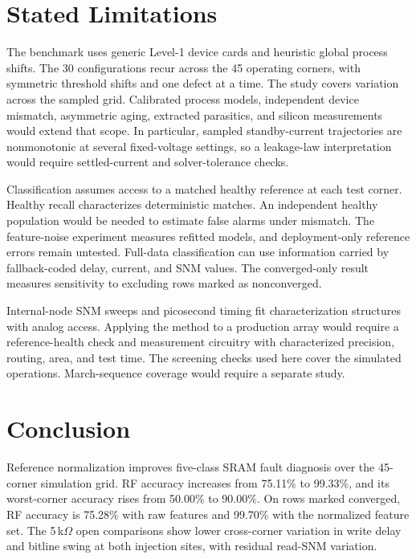 \documentclass[conference]{IEEEtran}
\begin{document}

\section{Stated Limitations}
\label{sec:limits}
The benchmark uses generic Level-1 device cards and heuristic global process shifts. The 30 configurations recur across the 45 operating corners, with symmetric threshold shifts and one defect at a time. The study covers variation across the sampled grid. Calibrated process models, independent device mismatch, asymmetric aging, extracted parasitics, and silicon measurements would extend that scope. In particular, sampled standby-current trajectories are nonmonotonic at several fixed-voltage settings, so a leakage-law interpretation would require settled-current and solver-tolerance checks.

Classification assumes access to a matched healthy reference at each test corner. Healthy recall characterizes deterministic matches. An independent healthy population would be needed to estimate false alarms under mismatch. The feature-noise experiment measures refitted models, and deployment-only reference errors remain untested. Full-data classification can use information carried by fallback-coded delay, current, and SNM values. The converged-only result measures sensitivity to excluding rows marked as nonconverged.

Internal-node SNM sweeps and picosecond timing fit characterization structures with analog access. Applying the method to a production array would require a reference-health check and measurement circuitry with characterized precision, routing, area, and test time. The screening checks used here cover the simulated operations. March-sequence coverage would require a separate study.


\section{Conclusion}
\label{sec:conclusion}
Reference normalization improves five-class SRAM fault diagnosis over the 45-corner simulation grid. RF accuracy increases from 75.11\% to 99.33\%, and its worst-corner accuracy rises from 50.00\% to 90.00\%. On rows marked converged, RF accuracy is 75.28\% with raw features and 99.70\% with the normalized feature set. The 5\,k$\Omega$ open comparisons show lower cross-corner variation in write delay and bitline swing at both injection sites, with residual read-SNM variation.
\end{document}
